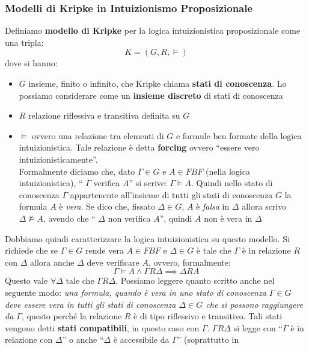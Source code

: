 \documentclass[a4paper,12pt, oneside]{book}
\begin{document}
\subsubsection{Modelli di Kripke in Intuizionismo Proposizionale}
\begin{definizione}
  Definiamo \textbf{modello di Kripke} per la logica intuizionistica
  proposizionale come una tripla:
  \[K=(G, R, \vDash)\]
  dove si hanno:
  \begin{itemize}
    \item $G$ insieme, finito o infinito, che Kripke chiama \textbf{stati di
      conoscenza}. Lo possiamo considerare come un \textbf{insieme discreto} di
    stati di conoscenza 
    \item $R$ relazione riflessiva e transitiva definita su $G$
    \item $\vDash$ ovvero una relazione tra elementi di $G$ e formule ben
    formate della logica intuizionistica. Tale relazione è detta
    \textbf{forcing} ovvero ``essere vero intuizionisticamente''.\\
    Formalmente diciamo che, dato $\Gamma\in G$ e $A\in FBF$ (nella logica
    intuizionistica), ``$\,\,\Gamma$ verifica $A$'' si scrive: $\Gamma\vDash
    A$. Quindi nello stato di conoscenza $\Gamma$ appartenente all'insieme di
    tutti gli stati di 
    conoscenza $G$ la formula $A$ è \emph{vera}. Se dico che, fissato $\Delta\in
    G$, $A$ è \emph{falsa} in $\Delta$ allora scrivo $\Delta\nvDash A$, avendo
    che ``$\,\,\Delta$ non verifica $A$'', quindi $A$ non è vera in $\Delta$
  \end{itemize}
\end{definizione}
Dobbiamo quindi caratterizzare la logica intuizionistica su questo modello. Si
richiede che se $\Gamma\in G$ rende vera $A\in FBF$ e $\Delta\in G$ è tale che
$\Gamma$ è in relazione $R$ con $\Delta$ allora anche $\Delta$ deve verificare
$A$, ovvero, formalmente:
\[\Gamma\vDash A \land \Gamma R\Delta\implies \Delta R A\]
Questo vale $\forall \Delta$ tale che $\Gamma R \Delta$.
Possiamo leggere quanto scritto anche nel seguente modo: \textit{una formula,
  quando è vera in uno stato di conoscenza $\Gamma\in G$ deve essere vera in
  tutti gli stati di conoscenza $\Delta\in G$ che si possono raggiungere da
  $\Gamma$}, questo perché la relazione $R$ è di tipo riflessivo e
transitivo. Tali stati vengono detti \textbf{stati compatibili}, in questo caso
con $\Gamma$. $\Gamma R \Delta$ si legge con ``$\Gamma$ è in relazione con
$\Delta$'' o anche  ``$\Delta$ è accessibile da $\Gamma$'' (soprattutto in
\end{document}
